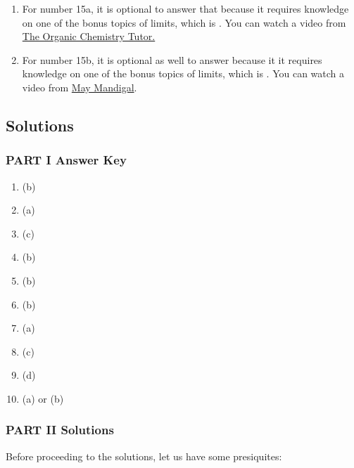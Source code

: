 \documentclass[10pt,paper=letter]{scrartcl}
\begin{document}
\begin{mdframed}[style=jremmdbox, frametitle=Remarks]

\begin{enumerate}
\item[(a)] For number 15a, it is optional to answer that because it requires knowledge on one of the bonus topics of limits, which is . You can watch a video from \href{https://www.youtube.com/watch?v=xvFqomOpLrs}{The Organic Chemistry Tutor.}

\item[(b)] For number 15b, it is optional as well to answer because it it requires knowledge on one of the bonus topics of limits, which is . You can watch a video from \href{https://www.youtube.com/watch?v=QGOnxeaw-q8}{May Mandigal}.
\end{enumerate}

\end{mdframed}




\newpage

\subsection{Solutions}


\subsubsection{PART I Answer Key}

\begin{enumerate}[label=\arabic*.,font=\bfseries]
\item (b)
\item (a)
\item (c)
\item (b)
\item (b)
\item (b)
\item (a)
\item (c)
\item (d)
\item (a) or (b) 
\end{enumerate}

\subsubsection{PART II Solutions} 

Before proceeding to the solutions, let us have some presiquites:
\end{document}
